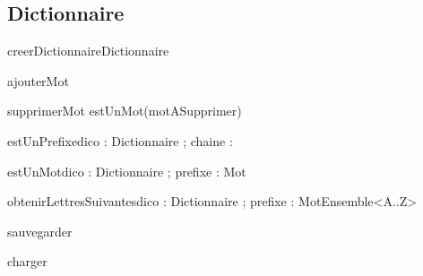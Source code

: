 \subsection{Dictionnaire}
\begin{algorithme}

  \signaturefonction
  {creerDictionnaire}{}{Dictionnaire}

  \signatureProcedure
  {ajouterMot}{ }

  \signatureProcedureAvecPreconditions
  {supprimerMot}{ }{estUnMot(motASupprimer)}

  \signaturefonction
  {estUnPrefixe}{dico : Dictionnaire ; chaine : \chaine}{\booleen}

  \signaturefonction
  {estUnMot}{dico : Dictionnaire ; prefixe : Mot}{\booleen}

  \signaturefonction
  {obtenirLettresSuivantes}{dico : Dictionnaire ; prefixe : Mot}{Ensemble<A..Z>}

  \signatureProcedure
  {sauvegarder}{}

  \signatureProcedure
  {charger}{ }

\end{algorithme}
